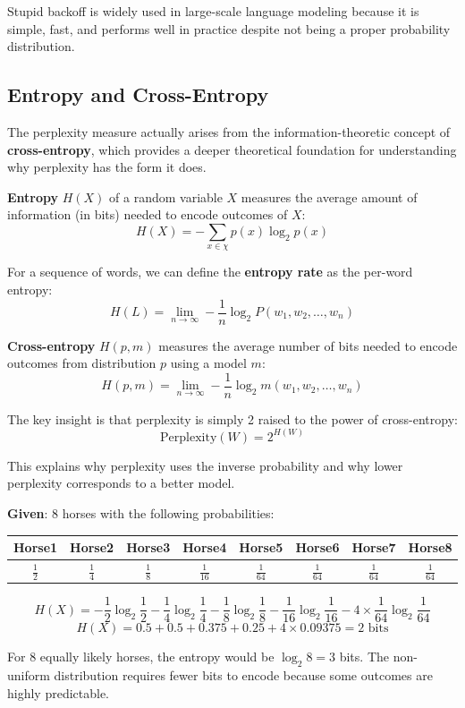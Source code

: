 \documentclass[11pt,a4paper]{article}
\begin{document}
Stupid backoff is widely used in large-scale language modeling because it is simple, fast, and performs well in practice despite not being a proper probability distribution.

\subsection{Entropy and Cross-Entropy}

The perplexity measure actually arises from the information-theoretic concept of \textbf{cross-entropy}, which provides a deeper theoretical foundation for understanding why perplexity has the form it does.

\textbf{Entropy} $H(X)$ of a random variable $X$ measures the average amount of information (in bits) needed to encode outcomes of $X$:
\[
H(X) = -\sum_{x \in \chi} p(x) \log_2 p(x)
\]

For a sequence of words, we can define the \textbf{entropy rate} as the per-word entropy:
\[
H(L) = \lim_{n \to \infty} -\frac{1}{n} \log_2 P(w_1, w_2, \ldots, w_n)
\]

\textbf{Cross-entropy} $H(p, m)$ measures the average number of bits needed to encode outcomes from distribution $p$ using a model $m$:
\[
H(p, m) = \lim_{n \to \infty} -\frac{1}{n} \log_2 m(w_1, w_2, \ldots, w_n)
\]

The key insight is that perplexity is simply 2 raised to the power of cross-entropy:
\[
\text{Perplexity}(W) = 2^{H(W)}
\]

This explains why perplexity uses the inverse probability and why lower perplexity corresponds to a better model.

\begin{tcolorbox}[colback=green!5!white,colframe=green!75!black,title=\textbf{Numerical: Entropy of a Horse Race}]
\textbf{Given}: 8 horses with the following probabilities:
\begin{center}
\begin{tabular}{|c|c|c|c|c|c|c|c|}
\hline
Horse1 & Horse2 & Horse3 & Horse4 & Horse5 & Horse6 & Horse7 & Horse8 \\ \hline
$\frac{1}{2}$ & $\frac{1}{4}$ & $\frac{1}{8}$ & $\frac{1}{16}$ & $\frac{1}{64}$ & $\frac{1}{64}$ & $\frac{1}{64}$ & $\frac{1}{64}$ \\ \hline
\end{tabular}
\end{center}

\[
H(X) = -\frac{1}{2}\log_2\frac{1}{2} - \frac{1}{4}\log_2\frac{1}{4} - \frac{1}{8}\log_2\frac{1}{8} - \frac{1}{16}\log_2\frac{1}{16} - 4 \times \frac{1}{64}\log_2\frac{1}{64}
\]
\[
H(X) = 0.5 + 0.5 + 0.375 + 0.25 + 4 \times 0.09375 = 2 \text{ bits}
\]

For 8 equally likely horses, the entropy would be $\log_2 8 = 3$ bits. The non-uniform distribution requires fewer bits to encode because some outcomes are highly predictable.
\end{tcolorbox}
\end{document}
